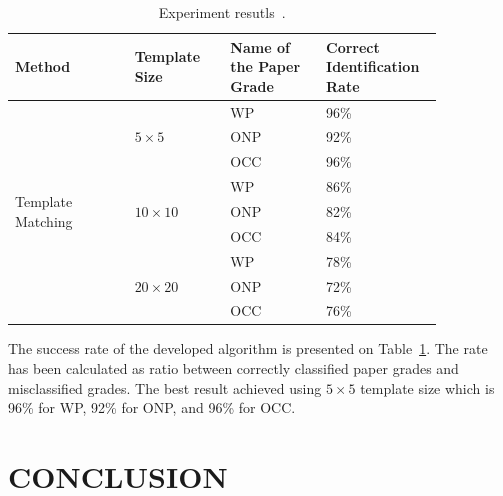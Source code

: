 \documentclass{lutmscthesis}[2010/09/22]
\begin{document}
\begin{table}[hpt]
\begin{center}
\caption{Experiment resutls~\cite{Rahman:2009}.\label{tab:exper}}
{\renewcommand{\arraystretch}{2}
\begin{tabular}{|p{0.25\linewidth}|p{0.2\linewidth}|p{0.2\linewidth}|p{0.2\linewidth}|}

\hline
\textbf{Method}
&
\textbf{Template Size}
&
\textbf{Name of the Paper Grade}
&
\textbf{Correct Identification Rate} \\
\hline

\multirow{9}{*}{Template Matching}
&
\multirow{3}{*}{$5\times5$}
& WP & 96\% \\
\cline{3-4}

&& ONP & 92\% \\
\cline{3-4}

&& OCC & 96\% \\
\cline{2-4}

& \multirow{3}{*}{$10\times10$}
& WP & 86\% \\
\cline{3-4}

&& ONP & 82\% \\
\cline{3-4}

&& OCC & 84\% \\
\cline{2-4}

& \multirow{3}{*}{$20\times20$}
& WP & 78\% \\
\cline{3-4}

&& ONP & 72\% \\
\cline{3-4}

&& OCC & 76\% \\
\hline

\end{tabular}}
\end{center}
\end{table}

The success rate of the developed algorithm is presented on Table~\ref{tab:exper}. The
rate has been calculated as ratio between correctly classified paper grades and
misclassified grades. The best result achieved using $5 \times 5$ template size which
is 96\% for WP, 92\% for ONP, and 96\% for OCC.

\section{ CONCLUSION }


\end{document}
